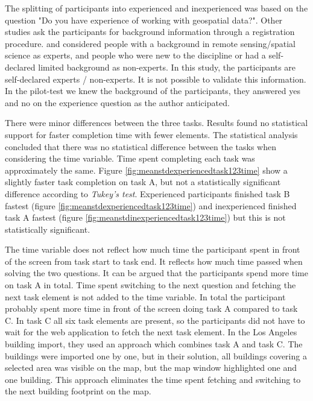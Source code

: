The splitting of participants into experienced and inexperienced was based on the question "Do you have experience of working with geospatial data?". Other studies ask the participants for background information through a registration procedure. \cite{See2013} and \cite{Salk2016} considered people with a background in remote sensing/spatial science as experts, and people who were new to the discipline or had a self-declared limited background as non-experts. In this study, the participants are self-declared experts / non-experts. It is not possible to validate this information. In the pilot-test we knew the background of the participants, they answered yes and no on the experience question as the author anticipated. 

There were minor differences between the three tasks. Results found no statistical support for faster completion time with fewer elements. The statistical analysis concluded that there was no statistical difference between the tasks when considering the time variable. Time spent completing each task was approximately the same. Figure \ref{fig:meanstdexperiencedtask123time} show a slightly faster task completion on task A, but not a statistically significant difference according to \textit{Tukey's test}. Experienced participants finished task B fastest (figure \ref{fig:meanstdexperiencedtask123time}) and inexperienced finished task A fastest (figure \ref{fig:meanstdinexperiencedtask123time}) but this is not statistically significant. 

The time variable does not reflect how much time the participant spent in front of the screen from task start to task end. It reflects how much time passed when solving the two questions. It can be argued that the participants spend more time on task A in total. Time spent switching to the next question and fetching the next task element is not added to the time variable. In total the participant probably spent more time in front of the screen doing task A compared to task C. In task C all six task elements are present, so the participants did not have to wait for the web application to fetch the next task element. In the Los Angeles building import, they used an approach which combines task A and task C. The buildings were imported one by one, but in their solution, all buildings covering a selected area was visible on the map, but the map window highlighted one and one building. This approach eliminates the time spent fetching and switching to the next building footprint on the map.  

